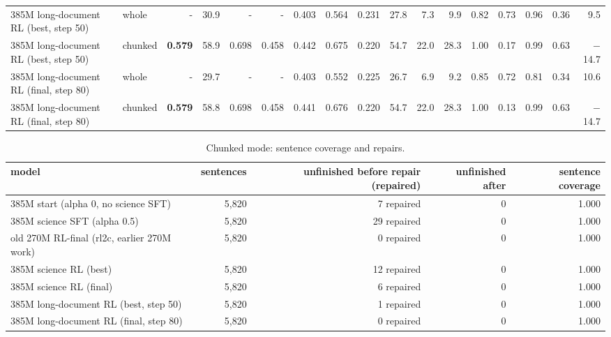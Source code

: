 \begin{table}[t]
\begin{adjustbox}{max width=\linewidth}
\begin{tabular}{@{}llrrrrrrrrrrrrrrr@{}}
385M long-document RL (best, step 50) & whole & - & 30.9 & - & - & 0.403 & 0.564 & 0.231 & 27.8 & 7.3 & 9.9 & 0.82 & 0.73 & 0.96 & 0.36 & 9.5 \\
385M long-document RL (best, step 50) & chunked & \textbf{0.579} & 58.9 & 0.698 & 0.458 & 0.442 & 0.675 & 0.220 & 54.7 & 22.0 & 28.3 & 1.00 & 0.17 & 0.99 & 0.63 & \ensuremath{-}14.7 \\
385M long-document RL (final, step 80) & whole & - & 29.7 & - & - & 0.403 & 0.552 & 0.225 & 26.7 & 6.9 & 9.2 & 0.85 & 0.72 & 0.81 & 0.34 & 10.6 \\
385M long-document RL (final, step 80) & chunked & \textbf{0.579} & 58.8 & 0.698 & 0.458 & 0.441 & 0.676 & 0.220 & 54.7 & 22.0 & 28.3 & 1.00 & 0.13 & 0.99 & 0.63 & \ensuremath{-}14.7 \\
\bottomrule
\end{tabular}\end{adjustbox}
\end{table}

\begin{table}[t]
\centering\scriptsize
\setlength{\tabcolsep}{4pt}
\caption{Chunked mode: sentence coverage and repairs.}\label{tab:doc-chunk-cov}
\begin{adjustbox}{max width=\linewidth}\begin{tabular}{@{}lrrrr@{}}
\toprule
model & sentences & unfinished before repair (repaired) & unfinished after & sentence coverage \\
\midrule
385M start (alpha 0, no science SFT) & 5,820 & 7 repaired & 0 & 1.000 \\
385M science SFT (alpha 0.5) & 5,820 & 29 repaired & 0 & 1.000 \\
old 270M RL-final (rl2c, earlier 270M work) & 5,820 & 0 repaired & 0 & 1.000 \\
385M science RL (best) & 5,820 & 12 repaired & 0 & 1.000 \\
385M science RL (final) & 5,820 & 6 repaired & 0 & 1.000 \\
385M long-document RL (best, step 50) & 5,820 & 1 repaired & 0 & 1.000 \\
385M long-document RL (final, step 80) & 5,820 & 0 repaired & 0 & 1.000 \\
\bottomrule
\end{tabular}\end{adjustbox}
\end{table}

